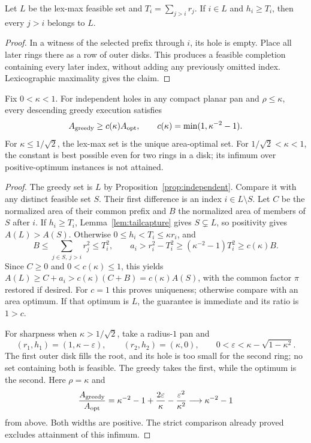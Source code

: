 \begin{lemma}\label{lem:tailcapture}
Let $L$ be the lex-max feasible set and $T_i=\sum_{j>i}r_j$.
If $i\in L$ and $h_i\ge T_i$, then every $j>i$ belongs to $L$.
\end{lemma}
\begin{proof}
In a witness of the selected prefix through $i$, its hole is empty.
Place all later rings there as a row of outer disks. This produces a
feasible completion containing every later index, without adding any
previously omitted index. Lexicographic maximality gives the claim.
\end{proof}

\begin{theorem}\label{thm:variable-area}
Fix $0<\kappa<1$. For independent holes in any compact planar pan
and $\rho\le\kappa$, every descending greedy execution satisfies
\[
 A_{\rm greedy}\ge c(\kappa) A_{\rm opt},\qquad
 c(\kappa)=\min(1,\kappa^{-2}-1).
\]
For $\kappa\le1/\sqrt2$, the lex-max set is the unique area-optimal
set. For $1/\sqrt2<\kappa<1$, the constant is best possible even for
two rings in a disk; its infimum over positive-optimum instances is
not attained.
\end{theorem}
\begin{proof}
The greedy set is $L$ by Proposition~\ref{prop:independent}. Compare
it with any distinct feasible set $S$. Their first difference is an
index $i\in L\setminus S$. Let $C$ be the normalized area of their
common prefix and $B$ the normalized area of members of $S$ after $i$.
If $h_i\ge T_i$, Lemma~\ref{lem:tailcapture} gives $S\subsetneq L$,
so positivity gives $A(L)>A(S)$. Otherwise
$0\le h_i<T_i\le\kappa r_i$, and
\[
 B\le\sum_{j\in S,\ j>i}r_j^2\le T_i^2,\qquad
 a_i>r_i^2-T_i^2\ge(\kappa^{-2}-1)T_i^2\ge c(\kappa)B.
\]
Since $C\ge0$ and $0<c(\kappa)\le1$, this yields
$A(L)\ge C+a_i>c(\kappa)(C+B)=c(\kappa)A(S)$, with the common
factor $\pi$ restored if desired. For $c=1$ this proves uniqueness;
otherwise compare with an area optimum. If that optimum is $L$, the
guarantee is immediate and its ratio is $1>c$.

For sharpness when $\kappa>1/\sqrt2$, take a radius-$1$ pan and
\[
 (r_1,h_1)=(1,\kappa-\varepsilon),\qquad
 (r_2,h_2)=(\kappa,0),\qquad
 0<\varepsilon<\kappa-\sqrt{1-\kappa^2}.
\]
The first outer disk fills the root, and its hole is too small for the
second ring; no set containing both is feasible. The greedy takes the
first, while the optimum is the second. Here $\rho=\kappa$ and
\[
 \frac{A_{\rm greedy}}{A_{\rm opt}}
 =\kappa^{-2}-1+\frac{2\varepsilon}{\kappa}
                  -\frac{\varepsilon^2}{\kappa^2}
 \longrightarrow\kappa^{-2}-1
\]
from above. Both widths are positive. The strict comparison already
proved excludes attainment of this infimum.
\end{proof}

